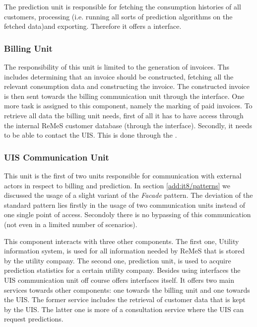 \npar The prediction unit is responsible for fetching the consumption
histories of all customers, processing (i.e. running all sorts of
prediction algorithms on the fetched data)and exporting. Therefore it offers a
 interface.

\subsubsection{Billing Unit}

\npar The responsibility of this unit is limited to the generation of invoices.
Ths includes determining that an invoice should be constructed, fetching all the
relevant consumption data and constructing the invoice. The constructed invoice
is then sent towards the billing communication unit through the
 interface. One more task is assigned to this
component, namely the marking of paid invoices. To retrieve all data the billing
unit needs, first of all it has to have access through the internal ReMeS
customer database (through the  interface).
Secondly, it needs to be able to contact the UIS. This is done through the
.

\subsubsection{UIS Communication Unit}

\npar This unit is the first of two units responsible for communication with
external actors in respect to billing and prediction. In section
\ref{add:it8/patterns} we discussed the usage of a slight variant of the
\emph{Facade} pattern. The deviation of the standard pattern lies firstly in the
usage of two communication units instead of one single point of access.
Secondoly there is no bypassing of this communication (not even in a limited
number of scenarios).

\npar This component interacts with three other components. The first one,
Utility information system, is used for all information needed by ReMeS that is
stored by the utility company. The second one, prediction unit, is used to
acquire prediction statistics for a certain utility company. Besides using
interfaces the UIS communication unit off course offers interfaces itself. It
offers two main services towards other components: one towards the billing unit
and one towards the UIS. The former service includes the retrieval of customer
data that is kept by the UIS. The latter one is more of a consultation service
where the UIS can request predictions.

